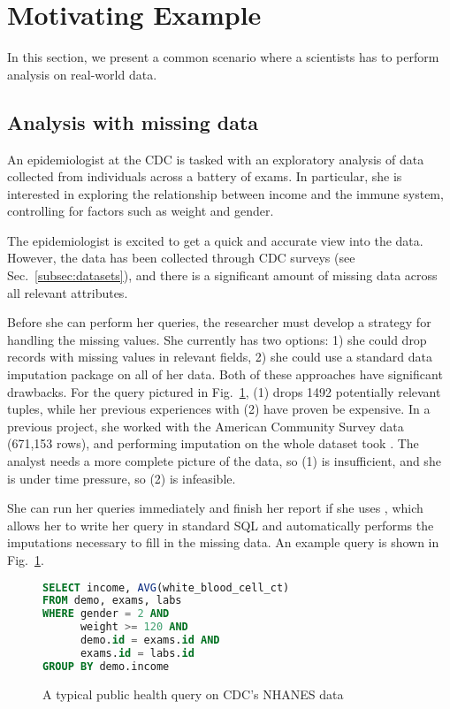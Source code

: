 \section{Motivating Example}
In this section, we present a common scenario where a scientists
has to perform analysis on real-world data.

\subsection{Analysis with missing data}
An epidemiologist at the CDC is tasked with an 
exploratory analysis of data collected from individuals across
a battery of exams. In particular, she is interested in exploring
the relationship between income and the immune system,
controlling for factors such as weight and gender.


The epidemiologist is excited
to get a quick and accurate view into the data. However,
the data has been collected through CDC surveys (see Sec.~\ref{subsec:datasets}),
and there is a significant amount of missing data across all
relevant attributes. 

Before she can perform her queries, the researcher must develop a strategy
for handling the missing values. She currently has two options:
1) she could drop records with missing values in relevant fields,
2) she could use a standard data imputation package on all of her data. Both of these
approaches have significant drawbacks. For the query pictured in 
Fig.~\ref{fig:example-query}, (1) drops 1492 potentially relevant tuples,
while her previous experiences with (2) have proven be expensive. In a previous project, she
worked with the American Community Survey data (671,153 rows), and performing imputation on the whole
dataset took . The analyst needs a more complete picture
of the data, so (1) is insufficient, and she is under time pressure, so (2)
is infeasible.

She can run her queries immediately and finish her report if
she uses \ProjectName{}, which allows her to write her
query in standard SQL and automatically performs the imputations necessary to fill in the missing data.
An example query is shown in Fig.~\ref{fig:example-query}.

\begin{figure}
\begin{lstlisting}[language=SQL]
SELECT income, AVG(white_blood_cell_ct)
FROM demo, exams, labs
WHERE gender = 2 AND 
      weight >= 120 AND
      demo.id = exams.id AND 
      exams.id = labs.id
GROUP BY demo.income
\end{lstlisting}
\caption{A typical public health query on CDC's NHANES data}
\label{fig:example-query}
\end{figure}

